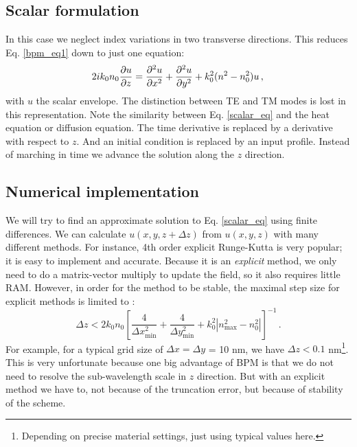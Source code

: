 \documentclass[]{article}
\begin{document}
	\subsection{Scalar formulation}
	In this case we neglect index variations in two transverse directions. This reduces Eq. \eqref{bpm_eq1} down to just one equation:
	\begin{equation}
		2i k_0 n_0 \frac{\partial u}{\partial z} = \frac{\partial^2u}{\partial x^2}+\frac{\partial^2u}{\partial y^2}+k_0^2(n^2-n_0^2)u \, ,\\
		\label{scalar_eq}
	\end{equation}
	with $u$ the scalar envelope. The distinction between TE and TM modes is lost in this representation. Note the similarity between Eq. \eqref{scalar_eq} and the heat equation or diffusion equation. The time derivative is replaced by a derivative with respect to $z$. And an initial condition is replaced by an input profile. Instead of marching in time we advance the solution along the $z$ direction.
	
	
	\subsection{Numerical implementation}	
	We will try to find an approximate solution to Eq. \eqref{scalar_eq} using finite differences. We can calculate $u(x,y, z+\Delta z)$ from $u(x,y,z)$ with many different methods. For instance, 4th order explicit Runge-Kutta is very popular; it is easy to implement and accurate. Because it is an \textit{explicit} method, we only need to do a matrix-vector multiply to update the field, so it also requires little RAM. However, in order for the method to be stable, the maximal step size for explicit methods is limited to \cite{Chung_Dagli_1991}:
	\begin{equation}
		\Delta z < 2 k_0 n_0 \left[\frac{4}{\Delta x_{\text{min}}^2} +\frac{4}{\Delta y_{\text{min}}^2}+k_0^2\left| n_{\text{max}}^2-n_0^2\right|  \right] ^{-1}\, .
	\end{equation}	
	For example, for a typical grid size of $\Delta x= \Delta y $ = 10 nm, we have $\Delta z < 0.1$ nm\footnote{Depending on precise material settings, just using typical values here.}. This is very unfortunate because one big advantage of BPM is that we do not need to resolve the sub-wavelength scale in $z$ direction. But with an explicit method we have to, not because of the truncation error, but because of stability of the scheme.\\
	
\end{document}
